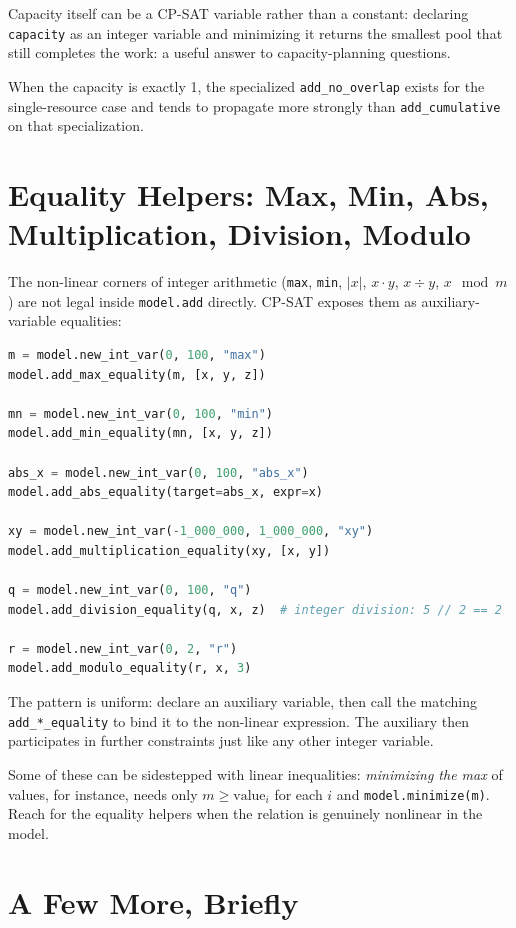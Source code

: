 Capacity itself can be a CP-SAT variable rather than a constant:
declaring \lstinline!capacity! as an integer variable and
minimizing it returns the smallest pool that still completes the work:
a useful answer to capacity-planning questions.

When the capacity is exactly 1, the specialized
\lstinline!add_no_overlap! exists for the
single-resource case and tends to propagate more strongly than
\lstinline!add_cumulative! on that specialization.

\section{Equality Helpers: Max, Min, Abs, Multiplication, Division, Modulo}\label{sec:7.10}

The non-linear corners of integer arithmetic
(\lstinline!max!, \lstinline!min!, \(|x|\),
\(x \cdot y\), \(x \div y\), \(x \mod m\)) are not legal inside
\lstinline!model.add! directly. CP-SAT exposes them as
auxiliary-variable equalities:

\begin{lstlisting}[language=Python]
m = model.new_int_var(0, 100, "max")
model.add_max_equality(m, [x, y, z])

mn = model.new_int_var(0, 100, "min")
model.add_min_equality(mn, [x, y, z])

abs_x = model.new_int_var(0, 100, "abs_x")
model.add_abs_equality(target=abs_x, expr=x)

xy = model.new_int_var(-1_000_000, 1_000_000, "xy")
model.add_multiplication_equality(xy, [x, y])

q = model.new_int_var(0, 100, "q")
model.add_division_equality(q, x, z)  # integer division: 5 // 2 == 2

r = model.new_int_var(0, 2, "r")
model.add_modulo_equality(r, x, 3)
\end{lstlisting}

The pattern is uniform: declare an auxiliary variable, then call the
matching \lstinline!add_*_equality! to bind it to the
non-linear expression. The auxiliary then participates in further
constraints just like any other integer variable.

Some of these can be sidestepped with linear inequalities:
\emph{minimizing the max} of values, for instance, needs only
\(m \ge \text{value}_i\) for each \(i\) and
\lstinline!model.minimize(m)!. Reach for the equality
helpers when the relation is genuinely nonlinear in the model.

\section{A Few More, Briefly}\label{sec:7.11}

